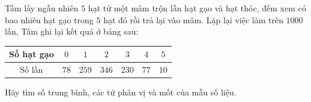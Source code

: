 \begin{ex}
Tấm lấy ngẫu nhiên $5$ hạt từ một mâm trộn lẫn hạt gạo và hạt thóc, đếm xem có bao nhiêu hạt gạo trong $5$ hạt đó rồi trả lại vào mâm. Lặp lại việc làm trên $1000$ lần, Tấm ghi lại kết quả ở bảng sau:
\begin{center}
\begin{tabular}{|c|c|c|c|c|c|c|}\hline
Số hạt gạo & $0$ & $1$ & $2$ & $3$ & $4$ & $5$\\\hline
Số lần & $78$ & $259$ & $346$ & $230$ & $77$ & $10$\\\hline
\end{tabular}
\end{center}
Hãy tìm số trung bình, các tứ phân vị và mốt của mẫu số liệu.
\end{ex}
